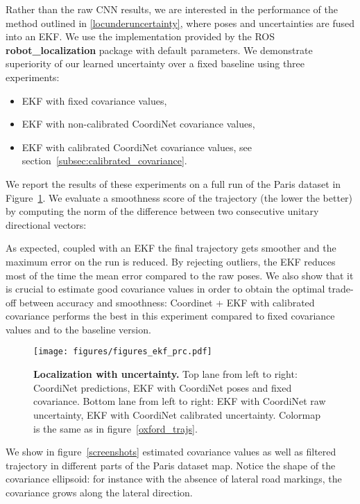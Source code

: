 \documentclass[10pt,twocolumn,letterpaper]{article}
\begin{document}
Rather than the raw CNN results, we are interested in the performance of the method outlined in \ref{locunderuncertainty}, where poses and uncertainties are fused into an EKF. We use the implementation provided by the ROS \textbf{robot\_localization} package with default parameters. We demonstrate superiority of our learned uncertainty over a fixed baseline using three experiments:
\begin{itemize}
    \item EKF with fixed covariance values,
    \item EKF with non-calibrated CoordiNet covariance values,
    \item EKF with calibrated CoordiNet covariance values, see section~\ref{subsec:calibrated_covariance}.
\end{itemize}
We report the results of these experiments on a full run of the Paris dataset in Figure~\ref{uncertainty_effect}. We evaluate a smoothness score  of the trajectory (the lower the better) by computing the norm of the difference between two consecutive unitary directional vectors:
 
As expected, coupled with an EKF the final trajectory gets smoother and the maximum error on the run is reduced. By rejecting outliers, the EKF reduces most of the time the mean error compared to the raw poses. We also show that it is crucial to estimate good covariance values in order to obtain the optimal trade-off between accuracy and smoothness: Coordinet + EKF with calibrated covariance performs the best in this experiment compared to fixed covariance values and to the baseline version.


\begin{figure}[!t]
   \centering
   \texttt{[image: figures/figures\_ekf\_prc.pdf]}
   \caption{\textbf{Localization with uncertainty.} Top lane from left to right: CoordiNet predictions, EKF with CoordiNet poses and fixed covariance. Bottom lane from left to right: EKF with CoordiNet raw uncertainty, EKF with CoordiNet calibrated uncertainty. Colormap is the same as in figure~\ref{oxford_trajs}.}\label{uncertainty_effect}
\end{figure}

We show in figure~\ref{screenshots} estimated covariance values as well as filtered trajectory in different parts of the Paris dataset map. Notice the shape of the covariance ellipsoid: for instance with the absence of lateral road markings, the covariance grows along the lateral direction.
\end{document}
